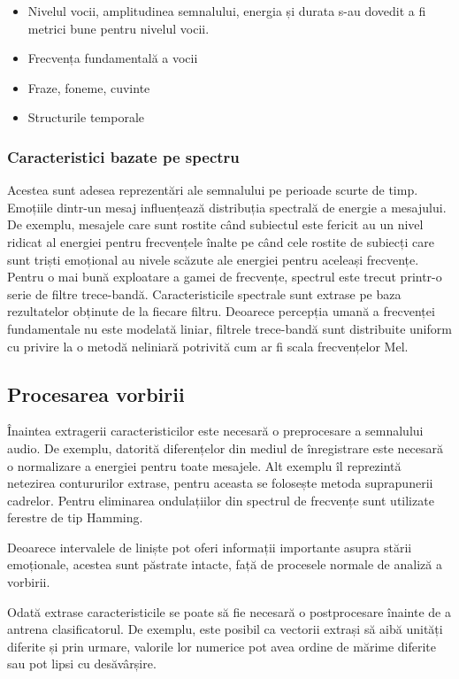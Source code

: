 \documentclass[9pt,shortpaper,twoside,web]{ieeecolor}
\begin{document}
\begin{itemize}
\item Nivelul vocii, amplitudinea semnalului, energia și durata s-au dovedit a fi metrici bune pentru nivelul vocii.

\item Frecvența fundamentală a vocii

\item Fraze, foneme, cuvinte

\item Structurile temporale
\end{itemize}


\subsubsection{Caracteristici bazate pe spectru}
Acestea sunt adesea reprezentări ale semnalului pe perioade scurte de timp. Emoțiile dintr-un mesaj influențează distribuția spectrală de energie a mesajului. De exemplu, mesajele care sunt rostite când subiectul este fericit au un nivel ridicat al energiei pentru frecvențele înalte pe când cele rostite de subiecți care sunt triști emoțional au nivele scăzute ale energiei pentru aceleași frecvențe. 
Pentru o mai bună exploatare a gamei de frecvențe, spectrul este trecut printr-o serie de filtre trece-bandă. Caracteristicile spectrale sunt extrase pe baza rezultatelor obținute de la fiecare filtru. Deoarece percepția umană a frecvenței fundamentale nu este modelată liniar, filtrele trece-bandă sunt distribuite uniform cu privire la o  metodă neliniară potrivită cum ar fi scala frecvențelor Mel. 


\subsection{Procesarea vorbirii}
Înaintea extragerii caracteristicilor este necesară o preprocesare a semnalului audio. De exemplu, datorită diferențelor din mediul de înregistrare este necesară o normalizare a energiei pentru toate mesajele. Alt exemplu îl reprezintă netezirea contururilor extrase, pentru aceasta se folosește metoda suprapunerii cadrelor. Pentru eliminarea ondulațiilor din spectrul de frecvențe sunt utilizate ferestre de tip Hamming.

Deoarece intervalele de liniște pot oferi informații importante asupra stării emoționale, acestea sunt păstrate intacte, față de procesele normale de analiză a vorbirii.

Odată extrase caracteristicile se poate să fie necesară o postprocesare înainte de a antrena clasificatorul. De exemplu, este posibil ca vectorii extrași să aibă unități diferite și prin urmare, valorile lor numerice pot avea ordine de mărime diferite sau pot lipsi cu desăvârșire.
\end{document}
